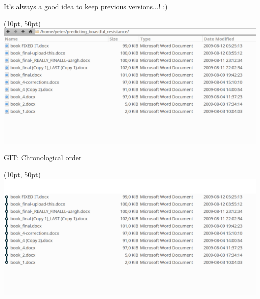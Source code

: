 \begin{frame}[fragile]{It's always a good idea to keep previous versions...! :)}
    \begin{textblock*}{\textwidth}(10pt, 50pt)
        \includegraphics[width=\textwidth]{images/screenshot-ugly-filenames-1.png}
    \end{textblock*}
\end{frame}


\begin{frame}[fragile]{GIT: Chronological order}
    \begin{textblock*}{\textwidth}(10pt, 50pt)
        \includegraphics[width=\textwidth]{images/screenshot-ugly-filenames-2.png}
    \end{textblock*}
\end{frame}


